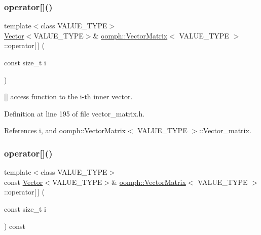 \mbox{\label{classoomph_1_1VectorMatrix_aeae9e2dcc8b7df4f0efd5890917013f9}} 
\subsubsection{\texorpdfstring{operator[]()}{operator[]()}\hspace{0.1cm}{\footnotesize\ttfamily [1/2]}}
{\footnotesize\ttfamily template$<$class V\+A\+L\+U\+E\+\_\+\+T\+Y\+PE$>$ \\
\hyperlink{classoomph_1_1Vector}{Vector}$<$V\+A\+L\+U\+E\+\_\+\+T\+Y\+PE$>$\& \hyperlink{classoomph_1_1VectorMatrix}{oomph\+::\+Vector\+Matrix}$<$ V\+A\+L\+U\+E\+\_\+\+T\+Y\+PE $>$\+::operator\mbox{[}$\,$\mbox{]} (\begin{DoxyParamCaption}\item[{const size\+\_\+t}]{i }\end{DoxyParamCaption})\hspace{0.3cm}{\ttfamily [inline]}}



\mbox{[}\mbox{]} access function to the i-\/th inner vector. 



Definition at line 195 of file vector\+\_\+matrix.\+h.



References i, and oomph\+::\+Vector\+Matrix$<$ V\+A\+L\+U\+E\+\_\+\+T\+Y\+P\+E $>$\+::\+Vector\+\_\+matrix.

\mbox{\label{classoomph_1_1VectorMatrix_a9b3af1734a4b7c8ba8db95d95b316904}} 
\subsubsection{\texorpdfstring{operator[]()}{operator[]()}\hspace{0.1cm}{\footnotesize\ttfamily [2/2]}}
{\footnotesize\ttfamily template$<$class V\+A\+L\+U\+E\+\_\+\+T\+Y\+PE$>$ \\
const \hyperlink{classoomph_1_1Vector}{Vector}$<$V\+A\+L\+U\+E\+\_\+\+T\+Y\+PE$>$\& \hyperlink{classoomph_1_1VectorMatrix}{oomph\+::\+Vector\+Matrix}$<$ V\+A\+L\+U\+E\+\_\+\+T\+Y\+PE $>$\+::operator\mbox{[}$\,$\mbox{]} (\begin{DoxyParamCaption}\item[{const size\+\_\+t}]{i }\end{DoxyParamCaption}) const\hspace{0.3cm}{\ttfamily [inline]}}



